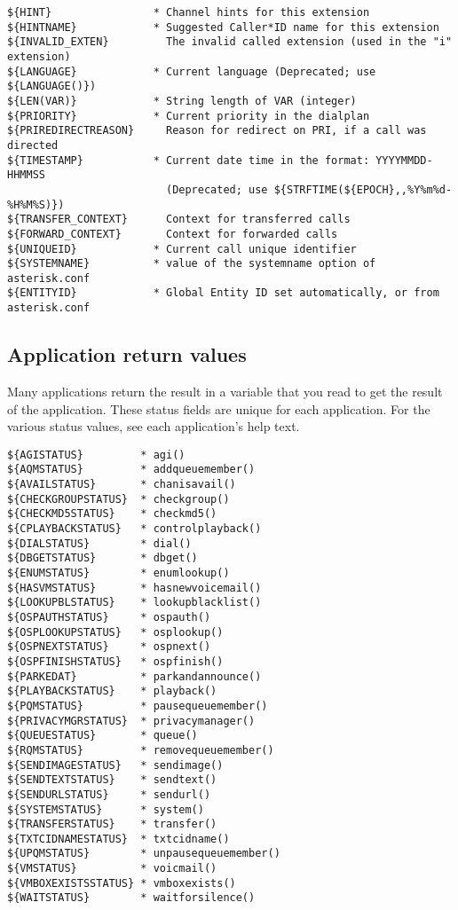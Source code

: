\begin{verbatim}
${HINT}                * Channel hints for this extension
${HINTNAME}            * Suggested Caller*ID name for this extension
${INVALID_EXTEN}         The invalid called extension (used in the "i" extension)
${LANGUAGE}            * Current language (Deprecated; use ${LANGUAGE()})
${LEN(VAR)}            * String length of VAR (integer)
${PRIORITY}            * Current priority in the dialplan
${PRIREDIRECTREASON}     Reason for redirect on PRI, if a call was directed
${TIMESTAMP}           * Current date time in the format: YYYYMMDD-HHMMSS
                         (Deprecated; use ${STRFTIME(${EPOCH},,%Y%m%d-%H%M%S)})
${TRANSFER_CONTEXT}      Context for transferred calls
${FORWARD_CONTEXT}       Context for forwarded calls
${UNIQUEID}            * Current call unique identifier
${SYSTEMNAME}          * value of the systemname option of asterisk.conf
${ENTITYID}            * Global Entity ID set automatically, or from asterisk.conf
\end{verbatim}

\subsection{Application return values}

Many applications return the result in a variable that you read to
get the result of the application. These status fields are unique
for each application.
For the various status values, see each application's help text.
\begin{verbatim}
${AGISTATUS}         * agi()
${AQMSTATUS}         * addqueuemember()
${AVAILSTATUS}       * chanisavail()
${CHECKGROUPSTATUS}  * checkgroup()
${CHECKMD5STATUS}    * checkmd5()
${CPLAYBACKSTATUS}   * controlplayback()
${DIALSTATUS}        * dial()
${DBGETSTATUS}       * dbget()
${ENUMSTATUS}        * enumlookup()
${HASVMSTATUS}       * hasnewvoicemail()
${LOOKUPBLSTATUS}    * lookupblacklist()
${OSPAUTHSTATUS}     * ospauth()
${OSPLOOKUPSTATUS}   * osplookup()
${OSPNEXTSTATUS}     * ospnext()
${OSPFINISHSTATUS}   * ospfinish()
${PARKEDAT}          * parkandannounce()
${PLAYBACKSTATUS}    * playback()
${PQMSTATUS}         * pausequeuemember()
${PRIVACYMGRSTATUS}  * privacymanager()
${QUEUESTATUS}       * queue()
${RQMSTATUS}         * removequeuemember()
${SENDIMAGESTATUS}   * sendimage()
${SENDTEXTSTATUS}    * sendtext()
${SENDURLSTATUS}     * sendurl()
${SYSTEMSTATUS}      * system()
${TRANSFERSTATUS}    * transfer()
${TXTCIDNAMESTATUS}  * txtcidname()
${UPQMSTATUS}        * unpausequeuemember()
${VMSTATUS}          * voicmail()
${VMBOXEXISTSSTATUS} * vmboxexists()
${WAITSTATUS}        * waitforsilence()
\end{verbatim}

